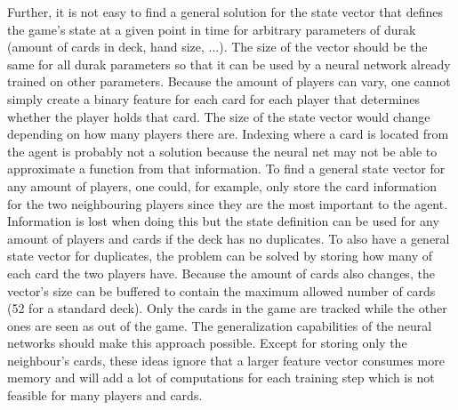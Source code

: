\documentclass[a4paper,titlepage]{article}
\begin{document}
Further, it is not easy to find a general solution for the state vector that defines the game's state at a given point in time for arbitrary parameters of durak (amount of cards in deck, hand size, ...). The size of the vector should be the same for all durak parameters so that it can be used by a neural network already trained on other parameters. Because the amount of players can vary, one cannot simply create a binary feature for each card for each player that determines whether the player holds that card. The size of the state vector would change depending on how many players there are. Indexing where a card is located from the agent is probably not a solution because the neural net may not be able to approximate a function from that information.
To find a general state vector for any amount of players, one could, for example, only store the card information for the two neighbouring players since they are the most important to the agent. Information is lost when doing this but the state definition can be used for any amount of players and cards if the deck has no duplicates. To also have a general state vector for duplicates, the problem can be solved by storing how many of each card the two players have.
Because the amount of cards also changes, the vector's size can be buffered to contain the maximum allowed number of cards (52 for a standard deck). Only the cards in the game are tracked while the other ones are seen as out of the game. The generalization capabilities of the neural networks should make this approach possible.
Except for storing only the neighbour's cards, these ideas ignore that a larger feature vector consumes more memory and will add a lot of computations for each training step which is not feasible for many players and cards.
\end{document}
